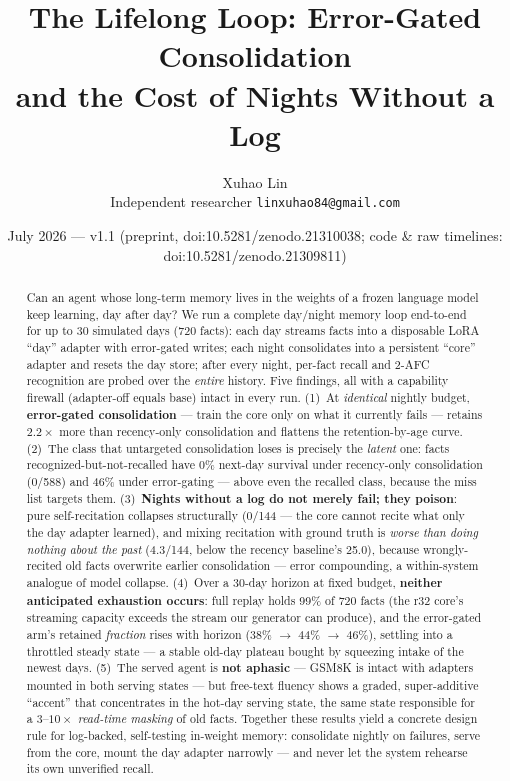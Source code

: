 \documentclass[11pt]{article}
\title{The Lifelong Loop: Error-Gated Consolidation\\ and the Cost of Nights Without a Log}
\author{Xuhao Lin\\ \small Independent researcher \quad \texttt{linxuhao84@gmail.com}}
\date{July 2026 --- v1.1 (preprint, doi:10.5281/zenodo.21310038; code \& raw timelines: doi:10.5281/zenodo.21309811)}
\begin{document}
\maketitle

\begin{abstract}
Can an agent whose long-term memory lives in the weights of a frozen language model keep learning,
day after day? We run a complete day/night memory loop end-to-end for up to 30 simulated days (720
facts): each day streams facts into a disposable LoRA ``day'' adapter with error-gated writes; each
night consolidates into a persistent ``core'' adapter and resets the day store; after every night,
per-fact recall and 2-AFC recognition are probed over the \emph{entire} history. Five findings, all
with a capability firewall (adapter-off equals base) intact in every run. (1)~At \emph{identical}
nightly budget, \textbf{error-gated consolidation} --- train the core only on what it currently
fails --- retains $2.2\times$ more than recency-only consolidation and flattens the retention-by-age
curve. (2)~The class that untargeted consolidation loses is precisely the \emph{latent} one: facts
recognized-but-not-recalled have 0\% next-day survival under recency-only consolidation (0/588) and
46\% under error-gating --- above even the recalled class, because the miss list targets them.
(3)~\textbf{Nights without a log do not merely fail; they poison}: pure self-recitation collapses
structurally (0/144 --- the core cannot recite what only the day adapter learned), and mixing
recitation with ground truth is \emph{worse than doing nothing about the past} (4.3/144, below the
recency baseline's 25.0), because wrongly-recited old facts overwrite earlier consolidation ---
error compounding, a within-system analogue of model collapse. (4)~Over a 30-day horizon at fixed
budget, \textbf{neither anticipated exhaustion occurs}: full replay holds 99\% of 720 facts (the r32
core's streaming capacity exceeds the stream our generator can produce), and the error-gated arm's
retained \emph{fraction} rises with horizon (38\% $\to$ 44\% $\to$ 46\%), settling into a throttled
steady state --- a stable old-day plateau bought by squeezing intake of the newest days.
(5)~The served agent is \textbf{not aphasic} --- GSM8K is intact with adapters mounted in both
serving states --- but free-text fluency shows a graded, super-additive ``accent'' that concentrates
in the hot-day serving state, the same state responsible for a $3$--$10\times$ \emph{read-time
masking} of old facts. Together these results yield a concrete design rule for log-backed,
self-testing in-weight memory: consolidate nightly on failures, serve from the core, mount the day
adapter narrowly --- and never let the system rehearse its own unverified recall.
\end{abstract}
\end{document}
